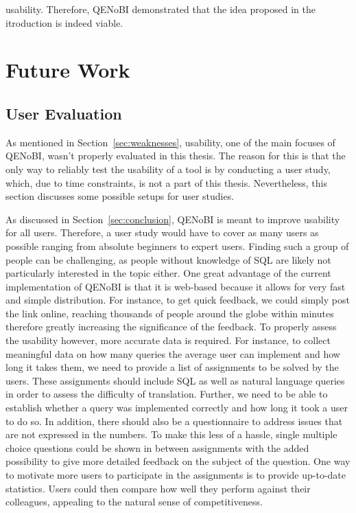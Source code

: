 \documentclass[11pt,a4paper]{globis-book}
\begin{document}
usability. Therefore, QENoBI demonstrated that the idea proposed in the itroduction is indeed viable.

\section{Future Work}
\subsection{User Evaluation}
\label{sec:user_eval}
As mentioned in Section~\ref{sec:weaknesses}, usability, one of the main focuses of QENoBI, wasn't properly evaluated in this thesis. The reason for this is that the only way to reliably test the usability of a tool is by conducting a user study, which, due to time constraints, is not a part of this thesis. Nevertheless, this section discusses some possible setups for user studies.

As discussed in Section~\ref{sec:conclusion}, QENoBI is meant to improve usability for all users. Therefore, a user study would have to cover as many users as possible ranging from absolute beginners to expert users. Finding such a group of people can be challenging, as people without knowledge of SQL are likely not particularly interested in the topic either. One great advantage of the current implementation of QENoBI is that it is web-based because it allows for very fast and simple distribution. For instance, to get quick feedback, we could simply post the link online, reaching thousands of people around the globe within minutes therefore greatly increasing the significance of the feedback. To properly assess the usability however, more accurate data is required. For instance, to collect meaningful data on how many queries the average user can implement and how long it takes them, we need to provide a list of assignments to be solved by the users. These assignments should include SQL as well as natural language queries in order to assess the difficulty of translation. Further, we need to be able to establish whether a query was implemented correctly and how long it took a user to do so. In addition, there should also be a questionnaire to address issues that are not expressed in the numbers. To make this less of a hassle, single multiple choice questions could be shown in between assignments with the added possibility to give more detailed feedback on the subject of the question. One way to motivate more users to participate in the assignments is to provide up-to-date statistics. Users could then compare how well they perform against their colleagues, appealing to the natural sense of competitiveness.
\end{document}
